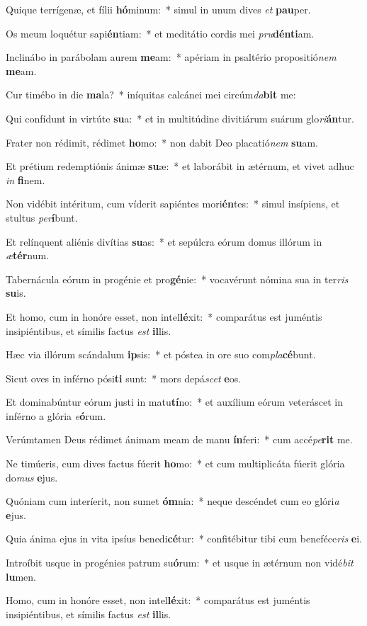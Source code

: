 \item Quique terrígenæ, et fílii \textbf{hó}minum:~* simul in unum dives \textit{et} \textbf{pau}per.
\item Os meum loquétur sapi\textbf{én}tiam:~* et meditátio cordis mei \textit{pru}\textbf{dén}\textbf{ti}am.
\item Inclinábo in parábolam aurem \textbf{me}am:~* apériam in psaltério propositió\textit{nem} \textbf{me}am.
\item Cur timébo in die \textbf{ma}la?~* iníquitas calcánei mei circúm\textit{da}\textbf{bit} me:
\item Qui confídunt in virtúte \textbf{su}a:~* et in multitúdine divitiárum suárum glo\textit{ri}\textbf{án}tur.
\item Frater non rédimit, rédimet \textbf{ho}mo:~* non dabit Deo placatió\textit{nem} \textbf{su}am.
\item Et prétium redemptiónis ánimæ \textbf{su}æ:~* et laborábit in ætérnum, et vivet adhuc \textit{in} \textbf{fi}nem.
\item Non vidébit intéritum, cum víderit sapiéntes mori\textbf{én}tes:~* simul insípiens, et stultus \textit{per}\textbf{í}bunt.
\item Et relínquent aliénis divítias \textbf{su}as:~* et sepúlcra eórum domus illórum in \textit{æ}\textbf{tér}num.
\item Tabernácula eórum in progénie et pro\textbf{gé}nie:~* vocavérunt nómina sua in ter\textit{ris} \textbf{su}is.
\item Et homo, cum in honóre esset, non intel\textbf{lé}xit:~* comparátus est juméntis insipiéntibus, et símilis factus \textit{est} \textbf{il}lis.
\item Hæc via illórum scándalum \textbf{ip}sis:~* et póstea in ore suo com\textit{pla}\textbf{cé}bunt.
\item Sicut oves in inférno pósi\textbf{ti} sunt:~* mors depá\textit{scet} \textbf{e}os.
\item Et dominabúntur eórum justi in matu\textbf{tí}no:~* et auxílium eórum veteráscet in inférno a glória \textit{e}\textbf{ó}rum.
\item Verúmtamen Deus rédimet ánimam meam de manu \textbf{ín}feri:~* cum accé\textit{pe}\textbf{rit} me.
\item Ne timúeris, cum dives factus fúerit \textbf{ho}mo:~* et cum multiplicáta fúerit glória do\textit{mus} \textbf{e}jus.
\item Quóniam cum interíerit, non sumet \textbf{óm}nia:~* neque descéndet cum eo glóri\textit{a} \textbf{e}jus.
\item Quia ánima ejus in vita ipsíus benedi\textbf{cé}tur:~* confitébitur tibi cum beneféce\textit{ris} \textbf{e}i.
\item Introíbit usque in progénies patrum su\textbf{ó}rum:~* et usque in ætérnum non vidé\textit{bit} \textbf{lu}men.
\item Homo, cum in honóre esset, non intel\textbf{lé}xit:~* comparátus est juméntis insipiéntibus, et símilis factus \textit{est} \textbf{il}lis.
